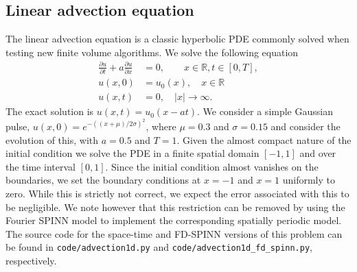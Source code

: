 \documentclass[12pt]{article}
\newcommand{\code}[1]{\lstinline{#1}}
\begin{document}
\subsection{Linear advection equation}
The linear advection equation is a classic hyperbolic PDE commonly solved when testing new finite volume algorithms.  We solve the following equation
\begin{displaymath}
\begin{split}
\frac{\partial u}{\partial t} + a \frac{\partial u}{\partial x} &= 0, \quad \quad x \in \mathbb{R}, t \in [0, T],\\
u(x, 0) &= u_0(x), \quad x \in \mathbb{R}\\
u(x, t) &= 0 , \quad |x| \rightarrow \infty.
\end{split}
\end{displaymath}
The exact solution is $u(x, t) = u_0(x - at)$.  We consider a simple Gaussian pulse, $u(x, 0) = e^{-((x + \mu)/2 \sigma)^2}$, where $\mu = 0.3$ and $\sigma=0.15$ and consider the evolution of this, with $a=0.5$ and $T=1$.  Given the almost compact nature of the initial condition we solve the PDE in a finite spatial domain $[-1, 1]$ and over the time interval $[0, 1]$.  Since the initial condition almost vanishes on the boundaries, we set the boundary conditions at $x= -1$ and $x=1$ uniformly to zero.  While this is strictly not correct, we expect the error associated with this to be negligible.  We note however that this restriction can be removed by using the Fourier SPINN model to implement the corresponding spatially periodic model.  The source code for the space-time and FD-SPINN versions of this problem can be found in \code{code/advection1d.py} and \code{code/advection1d_fd_spinn.py}, respectively.
\end{document}
